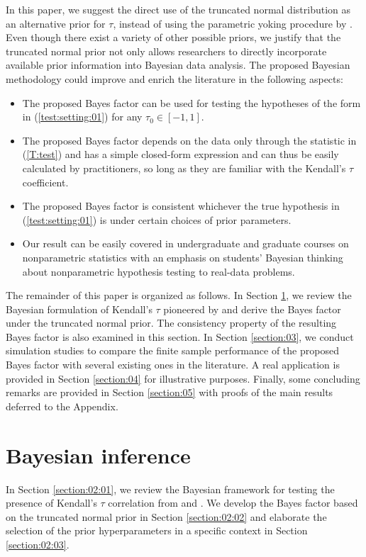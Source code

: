 \documentclass[11pt]{article}
\begin{document}
In this paper, we suggest the direct use of the truncated normal distribution as an alternative prior for $\tau$, instead of using the parametric yoking procedure by \cite{Doorn:Ly:Wage:2018}. Even though there exist a variety of other possible priors, we justify that the truncated normal prior not only allows researchers to directly incorporate available prior information into Bayesian data analysis. The proposed Bayesian methodology could improve and enrich the literature in the following aspects:
\begin{itemize}
    \item The proposed Bayes factor can be used for testing the hypotheses of the form in (\ref{test:setting:01}) for any $\tau_0 \in [-1, 1]$.
    \item The proposed Bayes factor depends on the data only through the statistic in (\ref{T:test}) and has a simple closed-form expression and can thus be easily calculated by practitioners, so long as they are familiar with the Kendall's $\tau$ coefficient.
    \item The proposed Bayes factor is consistent whichever the true hypothesis in (\ref{test:setting:01}) is under certain choices of prior parameters.
    \item Our result can be easily covered in undergraduate and graduate courses on nonparametric statistics with an emphasis on students' Bayesian thinking about nonparametric hypothesis testing to real-data problems.
\end{itemize}

The remainder of this paper is organized as follows. In Section \ref{section:02}, we review the Bayesian formulation of Kendall's $\tau$ pioneered by \cite{Yuan:John:2008} and derive the Bayes factor under the truncated normal prior. The consistency property of the resulting Bayes factor is also examined in this section. In Section \ref{section:03}, we conduct simulation studies to compare the finite sample performance of the proposed Bayes factor with several existing ones in the literature. A real application is provided in Section \ref{section:04} for illustrative purposes. Finally, some concluding remarks are provided in Section \ref{section:05} with proofs of the main results deferred to the Appendix.

\section{Bayesian inference} \label{section:02}

In Section \ref{section:02:01}, we review the Bayesian framework for testing the presence of Kendall's $\tau$ correlation from \cite{Yuan:John:2008} and \cite{Doorn:Ly:Wage:2018}. We develop the Bayes factor based on the truncated normal prior in Section \ref{section:02:02} and elaborate the selection of the prior hyperparameters in a specific context in Section \ref{section:02:03}.
\end{document}
